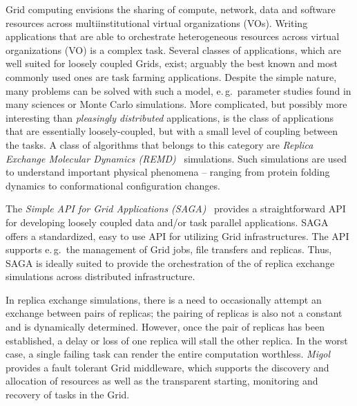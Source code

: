 \documentclass[times, 10pt,twocolumn]{article}
\begin{document}
                           
Grid computing envisions the sharing of compute, network, data and
software resources across multiinstitutional virtual organizations
(VOs). Writing applications that are able to orchestrate heterogeneous
resources across virtual organizations (VO) is a complex task.  Several 
classes of applications, which are well suited for loosely
coupled Grids, exist; arguably the best known and most commonly used ones are
task farming applications. Despite the simple nature, many problems
can be solved with such a model, e.\,g.\ parameter studies found in
many sciences or Monte Carlo simulations. More
complicated, but possibly more interesting than {\it pleasingly
  distributed} applications, is the class of applications that are
essentially loosely-coupled, but with a small level of coupling
between the tasks.   A class of algorithms that belongs to this category are
\emph{Replica Exchange Molecular Dynamics (REMD)}~\cite{hansmann,Sugita:1999rm} simulations.
Such simulations are used to understand important physical
phenomena -- ranging from protein folding dynamics to conformational
configuration changes.

The \emph{Simple API for Grid Applications (SAGA)}~\cite{saga_gfd90}
provides a straightforward API for developing loosely coupled data and/or task
parallel applications.
SAGA offers a standardized, easy to use API for utilizing Grid
infrastructures. The API supports e.\,g.\ the management of Grid jobs,
file transfers and replicas. Thus, SAGA is ideally suited to provide
the orchestration of the of replica exchange simulations across
distributed infrastructure.
                                                         
In replica exchange simulations, there is a need to occasionally attempt an exchange
between pairs of replicas; the pairing of replicas is also not a
constant and is dynamically determined. However, once the pair of
replicas has been established, a delay or loss of one replica will
stall the other replica. In the worst case, a single failing task can
render the entire computation worthless.
\emph{Migol}~\cite{schnorLuckow08} provides a fault tolerant Grid
middleware, which supports the discovery and allocation of resources
as well as the transparent starting, monitoring and recovery of tasks in the Grid.          
\end{document}
